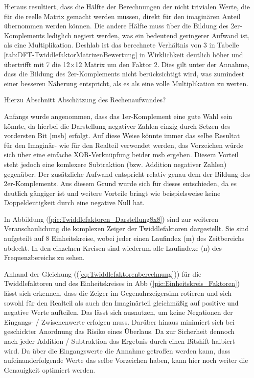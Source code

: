  
 
 Hieraus resultiert, dass die Hälfte der Berechnungen der nicht trivialen Werte, die für die reelle Matrix gemacht werden müssen,
 direkt für den imaginären Anteil übernommen werden können. Die andere Hälfte muss über die Bildung des 2er-Komplements lediglich negiert werden, was ein 
 bedeutend geringerer Aufwand ist, als eine Multiplikation. 
 Deshlab ist das berechnete Verhältnis von 3 in Tabelle \ref{tab:DFT-TwiddlefaktorMatrizenBewertung} in Wirklichkeit deutlich höher und übertrifft mit 7 die 12$\times$12
 Matrix um den Faktor 2. Dies gilt unter der Annahme, dass die Bildung des 2er-Komplements nicht berücksichtigt wird, was zumindest einer besseren Näherung 
 entspricht, als es als eine volle Multiplikation zu werten.
 
 Hierzu Abschnitt Abschätzung des Rechenaufwandes?
 
 Anfangs wurde angenommen, dass das 1er-Komplement eine gute Wahl sein könnte, da hierbei die Darstellung negativer Zahlen einzig durch Setzen des vordersten 
 Bit (\gls{msb}) erfolgt. Auf diese Weise könnte immer das selbe Resultat für den Imaginär- wie für den Realteil verwendet werden, das Vorzeichen würde sich über eine 
 einfache XOR-Verknüpfung beider \gls{msb} ergeben.
 Diesem Vorteil steht jedoch eine komlexere Subtraktion (bzw. Addition negativer Zahlen) gegenüber. Der zusätzliche Aufwand entspricht 
 relativ genau dem der Bildung des 2er-Komplements. Aus diesem Grund wurde sich für dieses entschieden, da es deutlich gängiger ist und weitere Vorteile bringt wie 
 beispielsweise keine Doppeldeutigkeit durch eine negative Null hat.
 
 In Abbildung (\ref{pic:Twiddlefaktoren_Darstellung8x8}) sind zur weiteren Veranschaulichung die komplexen Zeiger der Twiddlefaktoren dargestellt. Sie sind aufgeteilt auf 8 
 Einheitskreise, wobei jeder einen Laufindex (m) des Zeitbereichs abdeckt. In den einzelnen Kreisen sind wiederum alle Laufindexe (n) des Frequenzbereichs zu sehen.
 
 Anhand der Gleichung ((\ref{eq:Twiddlefaktorenberechnung})) für die Twiddlefaktoren und des Einheitskreises in Abb (\ref{pic:Einheitskreis_Faktoren}) lässt sich erkennen, 
 dass die Zeiger im Gegenuhrzeigersinn rotieren und sich sowohl für den Realteil als auch den Imaginärteil gleichmäßig auf positive und negative
 Werte aufteilen. Das lässt sich ausnutzen, um keine Negationen der Eingangs- / Zwischenwerte erfolgen muss. Darüber hinaus
 minimiert sich bei geschickter Anordnung das Risiko eines Überlaus. Da zur Sicherheit dennoch nach jeder Addition / Subtraktion
 das Ergebnis durch einen Bitshift halbiert wird. Da über die Eingangswerte die Annahme getroffen werden kann, dass 
 aufeinanderfolgende Werte das selbe Vorzeichen haben, kann hier noch weiter die Genauigkeit optimiert werden. 


